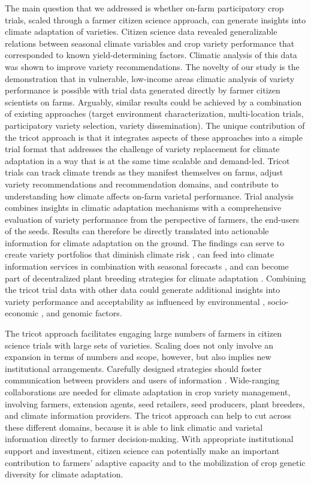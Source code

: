 \documentclass[9pt,twocolumn,twoside]{pnas-new}
\begin{document}
The main question that we addressed is whether on-farm participatory crop trials, scaled through a farmer citizen science approach, can generate insights into climate adaptation of varieties. Citizen science data revealed generalizable relations between seasonal climate variables and crop variety performance that corresponded to known yield-determining factors. Climatic analysis of this data was shown to improve variety recommendations.
The novelty of our study is the demonstration that in vulnerable, low-income areas climatic analysis of variety performance is possible with trial data generated directly by farmer citizen scientists on farms. Arguably, similar results could be achieved by a combination of existing approaches (target environment characterization, multi-location trials, participatory variety selection, variety dissemination). The unique contribution of the tricot approach is that it integrates aspects of these approaches into a simple trial format that addresses the challenge of variety replacement for climate adaptation in a way that is at the same time scalable and demand-led. Tricot trials can track climate trends as they manifest themselves on farms, adjust variety recommendations and recommendation domains, and contribute to understanding how climate affects on-farm varietal performance. Trial analysis combines insights in climatic adaptation mechanisms with a comprehensive evaluation of variety performance from the perspective of farmers, the end-users of the seeds. Results can therefore be directly translated into actionable information for climate adaptation on the ground. The findings can serve to create variety portfolios that diminish climate risk \cite{sukcharoen2016mean}, can feed into climate information services in combination with seasonal forecasts \cite{klemm2017development}, and can become part of decentralized plant breeding strategies for climate adaptation \cite{ceccarelli2015efficiency}. Combining the tricot trial data with other data could generate additional insights into variety performance and acceptability as influenced by environmental \cite{minet2017crowdsourcing}, socio-economic \cite{hammond2017rural}, and genomic \cite{kidane2017genome} factors. 

The tricot approach facilitates engaging large numbers of farmers in citizen science trials with large sets of varieties. Scaling does not only involve an expansion in terms of numbers and scope, however, but also implies new institutional arrangements. Carefully designed strategies should foster communication between providers and users of information \cite{hewitt2017improving}. Wide-ranging collaborations are needed for climate adaptation in crop variety management, involving farmers, extension agents, seed retailers, seed producers, plant breeders, and climate information providers. The tricot approach can help to cut across these different domains, because it is able to link climatic and varietal information directly to farmer decision-making. With appropriate institutional support and investment, citizen science can potentially make an important contribution to farmers' adaptive capacity and to the mobilization of crop genetic diversity for climate adaptation.
\end{document}
